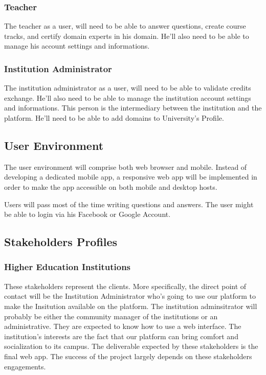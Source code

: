 \documentclass[12pt,a4paper,oneside, titlepage]{article}
\begin{document}
	    	\subsubsection{Teacher}
	    	The teacher as a user, will need to be able to answer questions, create course tracks, and certify domain experts 
	    	in his domain. He'll also need to be able to manage his account settings and informations.
	     
        \subsubsection{Institution Administrator}
        The institution administrator as a user, will need to be able to validate credits exchange. He'll also
	    need to be able to manage the institution account settings and informations. This person is the intermediary
	    between the institution and the platform. He'll need to be able to add domains to University's Profile.
	    
	    
	\subsection{User Environment}
	The user environment will comprise both web browser and mobile. Instead of developing a dedicated mobile app, a 
	responsive web app will be implemented in order to make the app accessible on both mobile and desktop hosts. \newline
	
	Users will pass most of the time writing questions and answers. The user might be able to login via his Facebook or 
	Google Account.
	
	\newpage 
	
	\subsection{Stakeholders Profiles}
	    \subsubsection{Higher Education Institutions}
	    These stakeholders represent the clients. More specifically, the direct point of contact will be the Institution
	    Administrator who's going to use our platform to make the Insitution available on the platform. The institution 
	    adminsitrator will probably be either the community manager of the institutions or an administrative. They are 
	    expected to know how to use a web interface. The institution's interests are the fact that our platform can bring
	    comfort and socialization to its campus. The deliverable expected by these stakeholders is the final web app. The
	    success of the project largely depends on these stakeholders engagements.
	    
\end{document}
